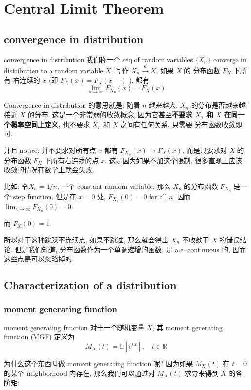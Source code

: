 \chapter{Central Limit Theorem}
\section{convergence in distribution}
\begin{definition}{convergence in distribution}
我们称一个 seq of random variables $\{X_n\}$ 
converge in distribution to a random variable $X$,
写作 $X_n \overset{d}{\longrightarrow} X$, 
如果 $X$ 的 
分布函数 $F_X$ 下所有
右连续的 $x$ (即 $F_X(x) = F_X(x-)$ ), 都有 $$ 
\lim_{n \to \infty} F_{X_n}(x) = F_X(x)
 $$
\end{definition}
\begin{remark}
Convergence in distribution 的意思就是:
随着 $n$ 越来越大, $X_n$ 的分布是否越来越接近 $X$ 的分布.  
这是一个非常弱的收敛概念, 
因为它甚至\textbf{不要求 $X_n$ 和 $X$ 在同一个概率空间上定义,} 
也不要求 $X_n$ 和 $X$ 之间有任何关系. 只需要
分布函数收敛即可.

并且 notice: 并不要求对所有点 $x$ 都有 $F_{X_n}(x) \to F_X(x)$,
而是只要求对 $X$ 的分布函数 $F_X$ 下所有右连续的点 
$x$. 
这是因为如果不加这个限制, 很多直观上应该收敛的情况在数学上就会失败.

比如: 令$X_n = 1/n$, 一个 constant random variable, 
那么 $X_n$ 的分布函数 $F_{X_n}$ 是一个 step function. 
但是在 $x=0$ 处, $F_{X_n}(0) = 0$ for all $n$, 
因而 $\lim_{n \to \infty} F_{X_n}(0) = 0$. 

而 $F_X(0) = 1$. 

所以对于这种跳跃不连续点, 如果不跳过, 那么就会得出 $X_n$ 不收敛于 $X$ 的错误结论.
但是我们知道, 分布函数作为一个单调递增的函数,
是 a.e. continuous 的, 因而这些点是可以忽略掉的. 
\end{remark}


\section{Characterization of a distribution}
\subsection{moment generating function}
\begin{definition}{moment generating function}
    对于一个随机变量 $X$, 其 moment generating function (MGF) 定义为
    $$
    M_X(t) = \mathbb{E}[e^{tX}], \quad t \in \mathbb{R}
    $$
\end{definition}
\begin{remark}
为什么这个东西叫做 moment generating function 呢?
因为如果 $M_X(t)$ 在 $t=0$ 的某个 neighborhood 内存在, 
那么我们可以通过对 $M_X(t)$ 求导来得到 $X$ 的各阶矩:
\end{remark}


